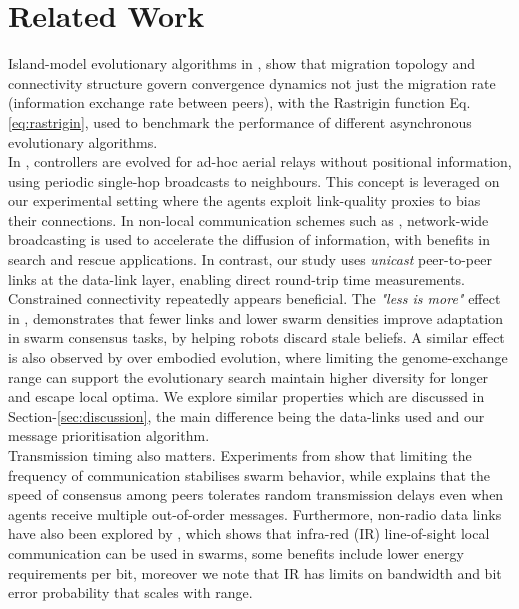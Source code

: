 \documentclass[conference]{IEEEtran}
\begin{document}
\section{Related Work}
Island-model evolutionary algorithms in \cite{rucinski_impact_2010}, show that migration topology and connectivity structure govern convergence dynamics not just the migration rate (information exchange rate between peers), with the Rastrigin function Eq. \ref{eq:rastrigin}, used to benchmark the performance of different asynchronous evolutionary algorithms. \\

In \cite{hauert_evolved_2009}, controllers are evolved for ad-hoc aerial relays without positional information, using periodic single-hop broadcasts to neighbours. This concept is leveraged on our experimental setting where the agents exploit link-quality proxies to bias their connections. In non-local communication schemes such as \cite{perrin_decentralised_2012}, network-wide broadcasting is used to accelerate the diffusion of information, with benefits in search and rescue applications. In contrast, our study uses \emph{unicast} peer-to-peer links at the data-link layer, enabling direct round-trip time measurements. \\

Constrained connectivity repeatedly appears beneficial. The \emph{"less is more"} effect in \cite{talamali_when_2021}, demonstrates that fewer links and lower swarm densities improve adaptation in swarm consensus tasks, by helping robots discard stale beliefs. A similar effect is also observed by \cite{hiraga_when_2023} over embodied evolution, where limiting the genome-exchange range can support the evolutionary search maintain higher diversity for longer and escape local optima. We explore similar properties which are discussed in Section-\ref{sec:discussion}, the main difference being the data-links used and our message prioritisation algorithm.  \\

Transmission timing also matters. Experiments from \cite{aust_hidden_2022} show that limiting the frequency of communication stabilises swarm behavior, while \cite{tsianos_impact_2012} explains that the speed of consensus among peers tolerates random transmission delays even when agents receive multiple out-of-order messages. Furthermore, non-radio data links have also been explored by \cite{trenkwalder_swarmcom_2020}, which shows that infra-red (IR) line-of-sight local communication can be used in swarms, some benefits include lower energy requirements per bit, moreover we note that IR has limits on bandwidth and bit error probability that scales with range. \\ 
\end{document}
